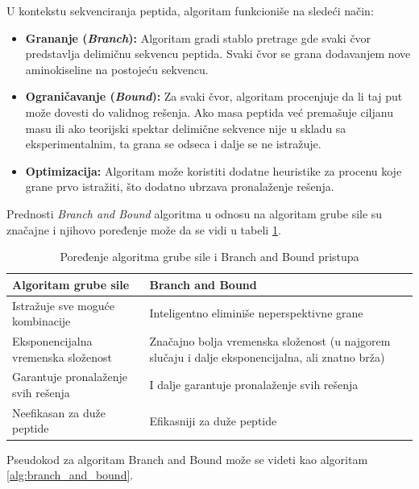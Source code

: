 \documentclass[12pt,oneside]{memoir}
\begin{document}
U kontekstu sekvenciranja peptida, algoritam funkcioniše na sledeći način:
\begin{itemize}
    \item \textbf{Grananje (\emph{Branch}):} Algoritam gradi stablo pretrage gde svaki čvor predstavlja delimičnu sekvencu peptida. Svaki čvor se grana dodavanjem nove aminokiseline na postojeću sekvencu.
    \item \textbf{Ograničavanje (\emph{Bound}):} Za svaki čvor, algoritam procenjuje da li taj put može dovesti do validnog rešenja. Ako masa peptida već premašuje ciljanu masu ili ako teorijski spektar delimične sekvence nije u skladu sa eksperimentalnim, ta grana se odseca i dalje se ne istražuje.
    \item \textbf{Optimizacija:} Algoritam može koristiti dodatne heuristike za procenu koje grane prvo istražiti, što dodatno ubrzava pronalaženje rešenja.
\end{itemize}

Prednosti \emph{Branch and Bound} algoritma u odnosu na algoritam grube sile su značajne i njihovo poređenje može da se vidi u tabeli \ref{tab:branch_vs_brute}.

\begin{table}[H]
\centering
\renewcommand{\arraystretch}{1.5}
\begin{tabular}{|>{\raggedright\arraybackslash}m{}|>{\raggedright\arraybackslash}m{}|}
\hline
\textbf{Algoritam grube sile} & \textbf{Branch and Bound} \\
\hline
Istražuje sve moguće kombinacije & Inteligentno eliminiše neperspektivne grane \\
\hline
Eksponencijalna vremenska složenost & Značajno bolja vremenska složenost (u najgorem slučaju i dalje eksponencijalna, ali znatno brža) \\
\hline
Garantuje pronalaženje svih rešenja & I dalje garantuje pronalaženje svih rešenja \\
\hline
Neefikasan za duže peptide & Efikasniji za duže peptide \\
\hline
\end{tabular}
\caption{Poređenje algoritma grube sile i Branch and Bound pristupa}
\label{tab:branch_vs_brute}
\end{table}

Pseudokod za algoritam Branch and Bound može se videti kao algoritam \ref{alg:branch_and_bound}.
\end{document}
